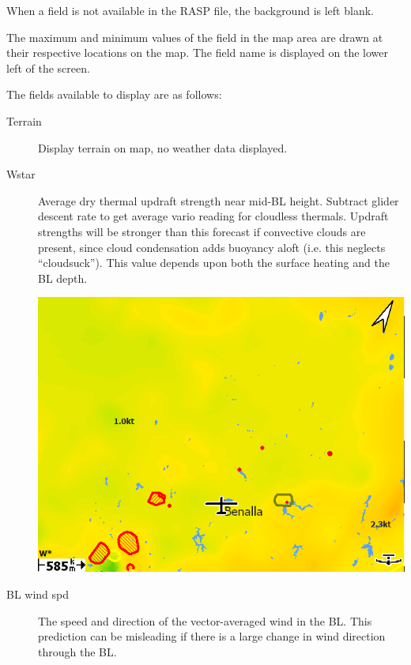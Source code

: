 \documentclass[a4paper,12pt]{refrep}
\begin{document}
When a field is not available in the RASP file, the background is left blank.

The maximum and minimum values of the field in the map area are drawn
at their respective locations on the map.  The field name is displayed
on the lower left of the screen.

The fields available to display are as follows:
\begin{description}
\item[Terrain] Display terrain on map, no weather data displayed.

\item[Wstar] 
Average dry thermal updraft strength near mid-BL height.  Subtract
glider descent rate to get average vario reading for cloudless
thermals.  Updraft strengths will be stronger than this forecast if
convective clouds are present, since cloud condensation adds buoyancy
aloft (i.e. this neglects ``cloudsuck'').  This value depends upon both
the surface heating and the BL depth.

\begin{center}
\includegraphics[angle=0,width=\linewidth,keepaspectratio='true']{figures/rasp-wstar.png}
\end{center}

\item[BL wind spd] 
The speed and direction of the vector-averaged wind in the BL.  This
prediction can be misleading if there is a large change in wind
direction through the BL.


\end{description}
\end{document}

